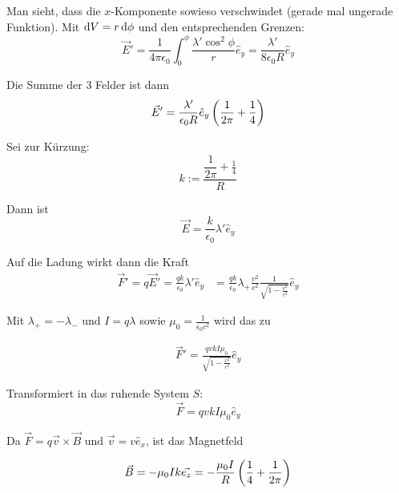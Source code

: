\documentclass[a4paper,german,12pt,smallheadings]{scrartcl}
\begin{document}
Man sieht, dass die $x$-Komponente sowieso verschwindet (gerade mal ungerade
Funktion). Mit $\dif V = r \dif \phi$ und den entsprechenden Grenzen:
\begin{equation}
  \vec{E}' = \frac{1}{4 \pi \epsilon_0} \int_0^\phi \frac{\lambda' \cos^2 \phi}{r} \hat{e}_y
  = \frac{\lambda'}{8 \epsilon_0 R} \hat{e}_y
\end{equation}

Die Summe der 3 Felder ist dann
\begin{align*}
  \vec{E}' = \frac{\lambda'}{\epsilon_0 R} \hat{e}_y \del{\frac{1}{2 \pi} + \frac{1}{4}}
\end{align*}

Sei zur Kürzung:
\begin{equation}
  k := \frac{\dfrac{1}{2 \pi} + \frac{1}{4}}{R}
\end{equation}

Dann ist
\begin{equation}
  \vec{E} = \frac{k}{\epsilon_0} \lambda' \hat{e}_y
\end{equation}

Auf die Ladung wirkt dann die Kraft
\begin{align*}
  \vec{F}' = q \vec{E}' = \frac{qk}{\epsilon_0} \lambda' \hat{e}_y
  &= \frac{qk}{\epsilon_0} \lambda_{+} \frac{v^2}{c^2} \frac{1}{\sqrt{1-\frac{v^2}{c^2}}} \hat{e}_y
\end{align*}

Mit $\lambda_+ = -\lambda_-$ und $I = q \lambda$ sowie $\mu_0 =
\frac{1}{\epsilon_0 c^2}$ wird das zu

\begin{align*}
  \vec{F}' = \frac{qv kI \mu_0}{\sqrt{1 - \frac{v^2}{c^2}}} \hat{e}_y
\end{align*}

Transformiert in das ruhende System $S$:
\begin{equation}
  \vec{F} = qvkI \mu_0 \hat{e}_y
\end{equation}

Da $\vec{F} = q\vec{v} \times \vec{B}$ und $\vec{v} = v \hat{e}_x$, ist das
Magnetfeld

\begin{equation}
  \vec{B} = - \mu_0 I k \vec{e_z} = - \frac{\mu_0 I}{R} \del{\frac{1}{4} + \frac{1}{2\pi}}
\end{equation}
\end{document}
